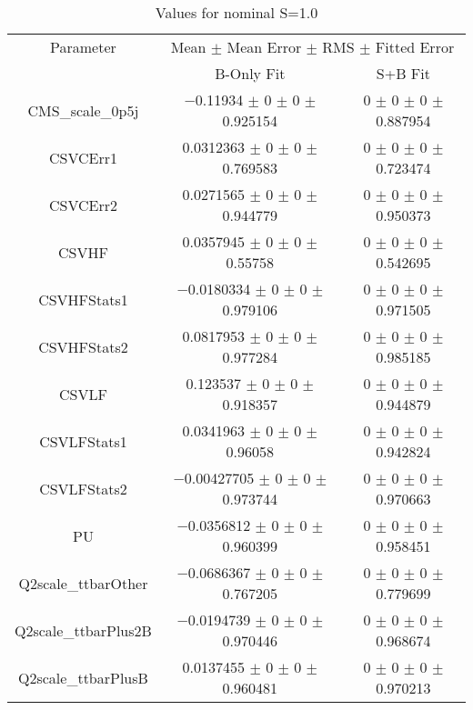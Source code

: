 \begin{table}
\centering
\caption{Values for nominal S=1.0}
\begin{tabular}{ccc}
\toprule
Parameter & \multicolumn{2}{c}{Mean $\pm$ Mean Error $\pm$ RMS $\pm$ Fitted Error}\\
 & B-Only Fit & S+B Fit\\
\midrule
CMS\_scale\_0p5j & \num{-0.11934} $\pm$ \num{0} $\pm$ \num{0} $\pm$ \num{0.925154} & \num{0} $\pm$ \num{0} $\pm$ \num{0} $\pm$ \num{0.887954}\\
CSVCErr1 & \num{0.0312363} $\pm$ \num{0} $\pm$ \num{0} $\pm$ \num{0.769583} & \num{0} $\pm$ \num{0} $\pm$ \num{0} $\pm$ \num{0.723474}\\
CSVCErr2 & \num{0.0271565} $\pm$ \num{0} $\pm$ \num{0} $\pm$ \num{0.944779} & \num{0} $\pm$ \num{0} $\pm$ \num{0} $\pm$ \num{0.950373}\\
CSVHF & \num{0.0357945} $\pm$ \num{0} $\pm$ \num{0} $\pm$ \num{0.55758} & \num{0} $\pm$ \num{0} $\pm$ \num{0} $\pm$ \num{0.542695}\\
CSVHFStats1 & \num{-0.0180334} $\pm$ \num{0} $\pm$ \num{0} $\pm$ \num{0.979106} & \num{0} $\pm$ \num{0} $\pm$ \num{0} $\pm$ \num{0.971505}\\
CSVHFStats2 & \num{0.0817953} $\pm$ \num{0} $\pm$ \num{0} $\pm$ \num{0.977284} & \num{0} $\pm$ \num{0} $\pm$ \num{0} $\pm$ \num{0.985185}\\
CSVLF & \num{0.123537} $\pm$ \num{0} $\pm$ \num{0} $\pm$ \num{0.918357} & \num{0} $\pm$ \num{0} $\pm$ \num{0} $\pm$ \num{0.944879}\\
CSVLFStats1 & \num{0.0341963} $\pm$ \num{0} $\pm$ \num{0} $\pm$ \num{0.96058} & \num{0} $\pm$ \num{0} $\pm$ \num{0} $\pm$ \num{0.942824}\\
CSVLFStats2 & \num{-0.00427705} $\pm$ \num{0} $\pm$ \num{0} $\pm$ \num{0.973744} & \num{0} $\pm$ \num{0} $\pm$ \num{0} $\pm$ \num{0.970663}\\
PU & \num{-0.0356812} $\pm$ \num{0} $\pm$ \num{0} $\pm$ \num{0.960399} & \num{0} $\pm$ \num{0} $\pm$ \num{0} $\pm$ \num{0.958451}\\
Q2scale\_ttbarOther & \num{-0.0686367} $\pm$ \num{0} $\pm$ \num{0} $\pm$ \num{0.767205} & \num{0} $\pm$ \num{0} $\pm$ \num{0} $\pm$ \num{0.779699}\\
Q2scale\_ttbarPlus2B & \num{-0.0194739} $\pm$ \num{0} $\pm$ \num{0} $\pm$ \num{0.970446} & \num{0} $\pm$ \num{0} $\pm$ \num{0} $\pm$ \num{0.968674}\\
Q2scale\_ttbarPlusB & \num{0.0137455} $\pm$ \num{0} $\pm$ \num{0} $\pm$ \num{0.960481} & \num{0} $\pm$ \num{0} $\pm$ \num{0} $\pm$ \num{0.970213}\\

\end{tabular}
\end{table}
